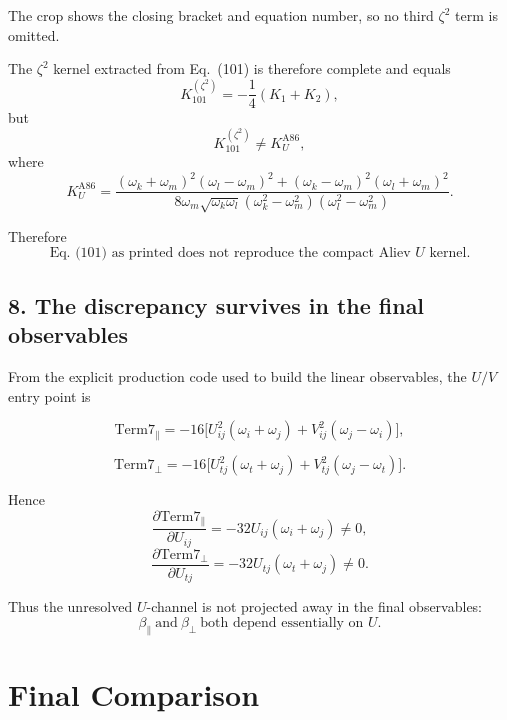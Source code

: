 \documentclass[11pt]{article}
\begin{document}
The crop shows the closing bracket and equation number, so no third \(\zeta^2\) term is omitted.

The \(\zeta^2\) kernel extracted from Eq.~(101) is therefore complete and equals
\[
K_{101}^{(\zeta^2)}=-\frac14(K_1+K_2),
\]
but
\[
K_{101}^{(\zeta^2)}\neq K_U^{\mathrm{A86}},
\]
where
\[
K_U^{\mathrm{A86}}=
\frac{(\omega_k+\omega_m)^2(\omega_l-\omega_m)^2+(\omega_k-\omega_m)^2(\omega_l+\omega_m)^2}
{8\omega_m\sqrt{\omega_k\omega_l}(\omega_k^2-\omega_m^2)(\omega_l^2-\omega_m^2)}.
\]

Therefore
\[
\boxed{\text{Eq.~(101) as printed does not reproduce the compact Aliev }U\text{ kernel.}}
\]

\subsection*{8. The discrepancy survives in the final observables}

From the explicit production code used to build the linear observables, the \(U/V\) entry point is

\[
\mathrm{Term7}_{\parallel}
=-16\Big[U_{ij}^2(\omega_i+\omega_j)+V_{ij}^2(\omega_j-\omega_i)\Big],
\]

\[
\mathrm{Term7}_{\perp}
=-16\Big[U_{tj}^2(\omega_t+\omega_j)+V_{tj}^2(\omega_j-\omega_t)\Big].
\]

Hence
\[
\frac{\partial \mathrm{Term7}_{\parallel}}{\partial U_{ij}}
=-32U_{ij}(\omega_i+\omega_j)\neq 0,
\]
\[
\frac{\partial \mathrm{Term7}_{\perp}}{\partial U_{tj}}
=-32U_{tj}(\omega_t+\omega_j)\neq 0.
\]

Thus the unresolved \(U\)-channel is not projected away in the final observables:
\[
\boxed{
\beta_{\parallel}\ \text{and}\ \beta_{\perp}\ \text{both depend essentially on }U.
}
\]

\section*{Final Comparison}
\end{document}
